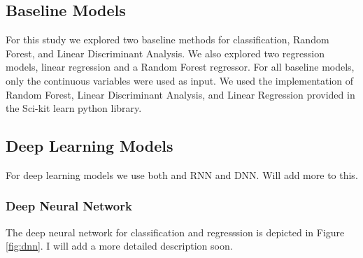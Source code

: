 \def\year{2017}\relax \documentclass[letterpaper]{article}
\begin{document}
\subsection{Baseline Models}
For this study we explored two baseline methods for classification, Random Forest, and Linear Discriminant Analysis. We also explored two regression models, linear regression and a Random Forest regressor. For all baseline models, only the continuous variables were used as input. We used the implementation of Random Forest, Linear Discriminant Analysis, and Linear Regression provided in the Sci-kit learn python library.

\subsection{Deep Learning Models}
For deep learning models we use both and RNN and DNN. Will add more to this.
\subsubsection{Deep Neural Network}
The deep neural network for classification and regresssion is depicted in Figure \ref{fig:dnn}. I will add a more detailed description soon.
\end{document}
